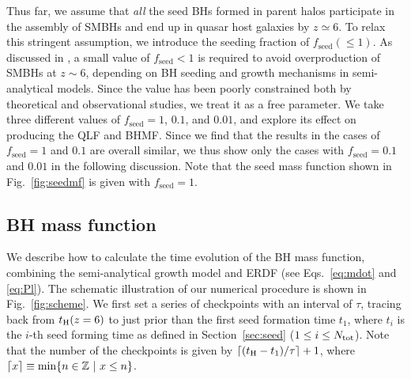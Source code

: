 \documentclass[twocolumn, twocolappendix]{aastex63}
\newcommand{\tlife}{\tau}
\newcommand{\fseed}{f_\mathrm{seed}}
\begin{document}
\begin{CJK*}{UTF8}{gbsn}
Thus far, we assume that {\it all} the seed BHs formed in parent halos participate in the assembly of SMBHs and 
end up in quasar host galaxies by $z\simeq 6$.
To relax this stringent assumption, we introduce the seeding fraction of $\fseed (\leq 1)$.
As discussed in \citet{2009ApJ...696.1798T}, a small value of $\fseed <1$ is required to avoid overproduction of SMBHs at $z\sim 6$,
depending on BH seeding and growth mechanisms in semi-analytical models.
Since the value has been poorly constrained both by theoretical and observational studies, we treat it as a free parameter.
We take three different values of $\fseed = 1$, $0.1$, and $0.01$, and explore its effect on producing the QLF and BHMF.
Since we find that the results in the cases of $\fseed = 1$ and $0.1$ are overall similar,
we thus show only the cases with $\fseed=0.1$ and $0.01$ in the following discussion.
Note that the seed mass function shown in Fig.~\ref{fig:seedmf} is given with $\fseed = 1$.


\vspace{2mm}
\subsection{BH mass function}\label{sec:MF}

We describe how to calculate the time evolution of the BH mass function, 
combining the semi-analytical growth model and ERDF (see Eqs.~\ref{eq:mdot} and \ref{eq:Pl}).
The schematic illustration of our numerical procedure is shown in Fig.~\ref{fig:scheme}. 
We first set a series of checkpoints with an interval of $\tlife$, 
tracing back from $t_{\rm H}(z=6)$ to just prior than the first seed formation time $t_1$, where $t_i$ is the $i$-th seed forming time
as defined in Section~\ref{sec:seed} ($1\leq i\leq N_{\rm tot}$).
Note that the number of the checkpoints is given by $\lceil (t_{\rm H}-t_1)/\tau \rceil+1$, where $\lceil x\rceil \equiv {\rm min}\{n \in \mathbb{Z}~ |~x\leq n\}$.



\end{CJK*}
\end{document}
